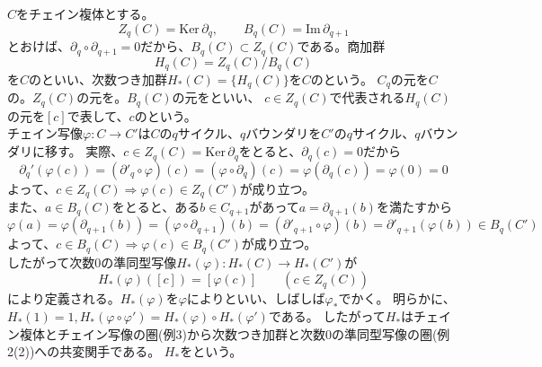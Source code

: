 \documentclass[dvipdfmx,a4paper,11pt]{jsarticle}
\begin{document}
\begin{tcolorbox}[title = 例5]
  $C$をチェイン複体とする。
  \begin{equation*}
    Z_{q}(C)=\text{Ker}\, \partial_{q},\qquad B_{q}(C)=\text{Im}\, \partial_{q+1}
  \end{equation*}
  とおけば、$\partial_{q}\circ \partial_{q+1} = 0$だから、$B_{q}(C)\subset Z_{q}(C)$である。商加群
  \begin{equation*}
    H_{q}(C)=Z_{q}(C)/B_{q}(C)
  \end{equation*}
  を$C$のといい、次数つき加群$H_{*}(C)=\{H_{q}(C)\}$を$C$のという。
  $C_q$の元を$C$の。$Z_{q}(C)$の元を。$B_{q}(C)$の元をといい、
  $c\in Z_{q}(C)$で代表される$H_{q}(C)$の元を$[c]$で表して、$c$のという。\\
  チェイン写像$\varphi : C\to C'$は$C$の$q$サイクル、$q$バウンダリを$C'$の$q$サイクル、$q$バウンダリに移す。
  実際、$c\in Z_{q}(C)=\text{Ker}\, \partial_{q}$をとると、$\partial_{q}(c)=0$だから
  \begin{equation*}
    \partial_{q}'(\varphi(c))=(\partial'_{q} \circ \varphi)(c)=(\varphi \circ \partial_{q})(c)=\varphi(\partial_{q}(c))=\varphi(0)=0
  \end{equation*}
  よって、$c\in Z_{q}(C)\Rightarrow \varphi(c)\in Z_{q}(C')$が成り立つ。\\
  また、$a\in B_{q}(C)$をとると、ある$b\in C_{q+1}$があって$a=\partial_{q+1}(b)$を満たすから
  \begin{equation*}
    \varphi(a)=\varphi(\partial_{q+1}(b))=(\varphi \circ \partial_{q+1})(b)=(\partial'_{q+1} \circ \varphi)(b)=\partial'_{q+1}(\varphi(b))\in B_{q}(C')
  \end{equation*}
  よって、$c\in B_{q}(C)\Rightarrow \varphi(c)\in B_{q}(C')$が成り立つ。\\
  したがって次数$0$の準同型写像$H_{*}(\varphi) : H_{*}(C)\to H_{*}(C')$が
  \begin{equation*}
    H_{*}(\varphi)([c])=[\varphi(c)]\qquad (c\in Z_{q}(C))
  \end{equation*}
  により定義される。$H_{*}(\varphi)$を$\varphi$によりといい、しばしば$\varphi_{*}$でかく。
  明らかに、$H_{*}(1)=1,H_{*}(\varphi \circ \varphi')=H_{*}(\varphi)\circ H_{*}(\varphi')$である。
  したがって$H_{*}$はチェイン複体とチェイン写像の圏(例3)から次数つき加群と次数$0$の準同型写像の圏(例2(2))への共変関手である。
  $H_{*}$をという。
\end{tcolorbox}
\end{document}
